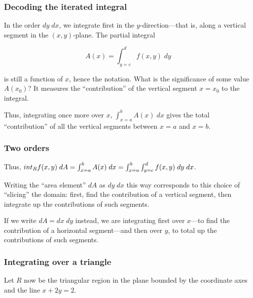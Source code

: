 \documentclass[11pt,ignorenonframetext,]{beamer}
\begin{document}
\begin{frame}\frametitle{Decoding the iterated integral}

In the order $dy \; dx$, we integrate first in the $y$-direction---that
is, along a vertical segment in the $(x,y)$-plane. The partial integral

\[ A(x) = \int_{y = c}^d f(x,y) \; dy \]

is still a function of $x$, hence the notation. What is the significance
of some value $A(x_0)$? It measures the ``contribution'' of the vertical
segment $x=x_0$ to the integral.

Thus, integrating once more over $x$, $\int_{x=a}^b A(x) \; dx$ gives
the total ``contribution'' of all the vertical segments between $x=a$
and $x=b$.

\end{frame}

\begin{frame}\frametitle{Two orders}

Thus,
$\\int_R f(x,y) \; dA = \int_{x=a}^b A(x) \; dx = \int_{x=a}^b \int_{y=c}^d f(x,y) \; dy \; dx$.

Writing the ``area element'' $dA$ as $dy \; dx$ this way corresponds to
this choice of ``slicing'' the domain: first, find the contribution of a
vertical segment, then integrate up the contributions of such segments.

If we write $dA = dx \; dy$ instead, we are integrating first over
$x$---to find the contribution of a horizontal segment---and then over
$y$, to total up the contributions of such segments.

\end{frame}

\begin{frame}\frametitle{Integrating over a triangle}

Let $R$ now be the triangular region in the plane bounded by the
coordinate axes and the line $x + 2y = 2$.

\end{frame}
\end{document}

